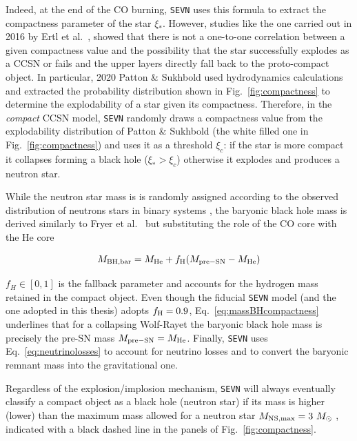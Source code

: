 \documentclass[a4paper,titlepage]{book}     	%
\newcommand{\sun}{\ensuremath{_\odot}}
\newcommand{\msun}{\ensuremath{M\sun}}
\begin{document}
Indeed, at the end of the CO burning, \texttt{SEVN} uses this formula to extract the compactness parameter of the star $\xi_*$. However, studies like the one carried out in 2016 by Ertl et al.\ \cite{Ertl2016}, showed that there is not a one-to-one correlation between a given compactness value and the possibility that the star successfully explodes as a CCSN or fails and the upper layers directly fall back to the proto-compact object. In particular, 2020 Patton \& Sukhbold \cite{COcollapse} used hydrodynamics calculations and extracted the probability distribution shown in Fig.\ \ref{fig:compactness} to determine the explodability of a star given its compactness. Therefore, in the \emph{compact} CCSN model, \texttt{SEVN} randomly draws a compactness value from the explodability distribution of Patton \& Sukhbold (the white filled one in Fig.\ \ref{fig:compactness}) and uses it as a threshold $\xi_c$: if the star is more compact it collapses forming a black hole ($\xi_* > \xi_c$) otherwise it explodes and produces a neutron star.

While the neutron star mass is is randomly assigned according to the observed distribution of neutrons stars in binary systems \cite{mapelli2020_compactness}, the baryonic black hole mass is derived similarly to Fryer et al.\ \cite{Fryer2012} but substituting the role of the CO core with the He core

\begin{equation}\label{eq:massBHcompactness}
    M_{\rm BH, bar} = M_{\rm He} + f_{\rm H} (M_{\rm pre-SN}-M_{\rm He})
\end{equation}

$f_H \in [0,1]$ is the fallback parameter and accounts for the hydrogen mass retained in the compact object. Even though the fiducial \texttt{SEVN} model (and the one adopted in this thesis) adopts $f_{\rm H} = 0.9$, Eq.\ \ref{eq:massBHcompactness} underlines that for a collapsing Wolf-Rayet the baryonic black hole mass is precisely the pre-SN mass $M_{\rm pre-SN}=M_{\rm He}$. Finally, \texttt{SEVN} uses Eq.\ \ref{eq:neutrinolosses} to account for neutrino losses and to convert the baryonic remnant mass into the gravitational one. 

Regardless of the explosion/implosion mechanism, \texttt{SEVN} will always eventually classify a compact object as a black hole (neutron star) if its mass is higher (lower) than the maximum mass allowed for a neutron star $M_{\rm NS,max} = 3~\msun$ \cite{NSreview,spera2019_mergingBBH}, indicated with a black dashed line in the panels of Fig.\ \ref{fig:compactness}.
\end{document}
